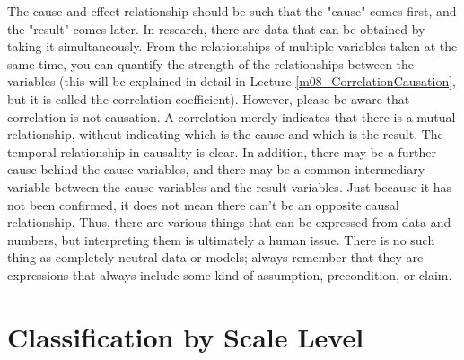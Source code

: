 \documentclass{ltjsbook}
\begin{document}
The cause-and-effect relationship should be such that the "cause" comes first, and the "result" comes later. In research, there are data that can be obtained by taking it simultaneously. From the relationships of multiple variables taken at the same time, you can quantify the strength of the relationships between the variables (this will be explained in detail in Lecture \ref{m08_CorrelationCausation}, but it is called the correlation coefficient). However, please be aware that correlation is not causation. A correlation merely indicates that there is a mutual relationship, without indicating which is the cause and which is the result. The temporal relationship in causality is clear. In addition, there may be a further cause behind the cause variables, and there may be a common intermediary variable between the cause variables and the result variables. Just because it has not been confirmed, it does not mean there can't be an opposite causal relationship. Thus, there are various things that can be expressed from data and numbers, but interpreting them is ultimately a human issue. There is no such thing as completely neutral data or models; always remember that they are expressions that always include some kind of assumption, precondition, or claim.


\section{Classification by Scale Level}
\end{document}
